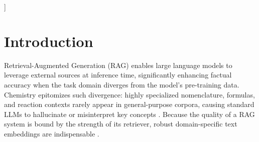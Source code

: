 \documentclass[twoside,twocolumn,9pt]{article}
\begin{document}
\begin{@twocolumnfalse}
 \end{@twocolumnfalse} \vspace{0.6cm}

  ]

\renewcommand*\rmdefault{bch}\normalfont\upshape
\rmfamily
\section*{}
\vspace{-1cm}








\section{Introduction}
Retrieval-Augmented Generation (RAG) enables large language models to leverage external sources at inference time, significantly enhancing factual accuracy when the task domain diverges from the model’s pre-training data. Chemistry epitomizes such divergence: highly specialized nomenclature, formulas, and reaction contexts rarely appear in general-purpose corpora, causing standard LLMs to hallucinate or misinterpret key concepts \cite{peng2021domain,acharya2024exploring,gu2021domain,zhang2024chemllm}. Because the quality of a RAG system is bound by the strength of its retriever, robust domain-specific text embeddings are indispensable \cite{nussbaum2024nomic}.
\end{document}
